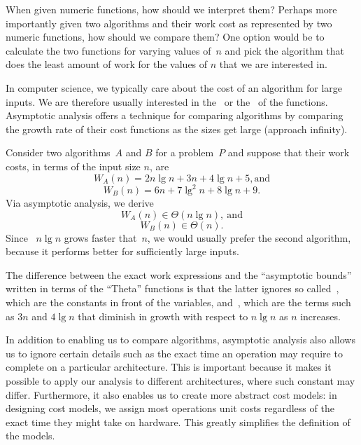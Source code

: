 \begin{flex}

  \begin{gram}
When given numeric functions, how should we interpret them?
%
Perhaps more importantly given two algorithms and their work cost as
represented by two numeric functions, how should we compare them?
%
One option would be to calculate the two functions for varying values
of~$n$ and pick the algorithm that does the least amount of work for
the values of $n$ that we are interested in.

In computer science, we typically care about the cost of an algorithm
for large inputs.
%
We are therefore usually interested in the~ or
the~ of the functions.
%
Asymptotic analysis offers a technique for comparing algorithms by
comparing the growth rate of their cost functions as the sizes get
large (approach infinity).
%
\end{gram}

\begin{example}[Asymptotics]
Consider two algorithms~$A$ and $B$ for a problem~$P$ and suppose that
their work costs, in terms of the input size $n$, are 
%
$$W_A(n) = 2n\lg{n} + 3n + 4\lg{n} + 5, \mbox{and}$$
%
$$W_B(n) = 6n + 7\lg^2{n} + 8\lg{n}+ 9.$$
%
Via asymptotic analysis, we derive 
%
$$W_A(n) \in \Theta(n\lg{n}),~\mbox{and}$$
%
$$W_B(n) \in \Theta(n).$$
%
Since ~$n\lg{n}$ grows faster that~$n$, we would usually prefer the
second algorithm, because it performs better for sufficiently large
inputs.

%
The difference between the exact work expressions and the ``asymptotic
bounds'' written in terms of the ``Theta'' functions is that the
latter ignores so called~, which are the
constants in front of the variables, and~,
which are the terms such as $3n$ and $4\lg{n}$ that diminish in
growth with respect to $n\lg{n}$ as $n$ increases.
%
\end{example}

\end{flex}

\begin{remark}
In addition to enabling us to compare algorithms, asymptotic analysis
also allows us to ignore certain details such as the exact time an
operation may require to complete on a particular architecture.
%
This is important because it makes it possible to apply our analysis
to different architectures, where such constant may differ.
%
Furthermore, it also enables us to create more abstract cost models:
in designing cost models, we assign most operations unit costs
regardless of the exact time they might take on hardware.
%
This greatly simplifies the definition of the models.
\end{remark}

